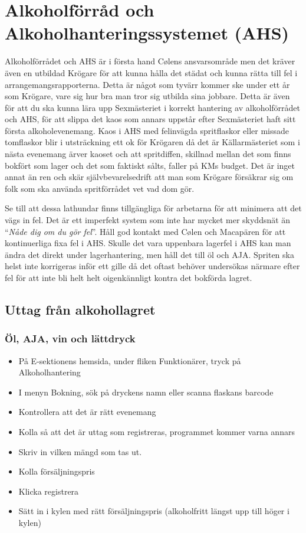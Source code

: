\documentclass[10pt]{article}
\begin{document}
\section{Alkoholförråd och Alkoholhanteringssystemet (AHS)}
Alkoholförrådet och AHS är i första hand Cølens ansvarsområde men det kräver även en utbildad Krögare för att kunna hålla det städat och kunna rätta till fel i arrangemangsrapporterna. Detta är något som tyvärr kommer ske under ett år som Krögare, vare sig hur bra man tror sig utbilda sina jobbare. Detta är även för att du ska kunna lära upp Sexmästeriet i korrekt hantering av alkoholförrådet och AHS, för att slippa det kaos som annars uppstår efter Sexmästeriet haft sitt första alkoholevenemang. Kaos i AHS med felinvägda spritflaskor eller missade tomflaskor blir i utsträckning ett ok för Krögaren då det är Källarmästeriet som i nästa evenemang ärver kaoset och att spritdiffen, skillnad mellan det som finns bokfört som lager och det som faktiskt sålts, faller på KMs budget. Det är inget annat än ren och skär självbevarelsedrift att man som Krögare försäkrar sig om folk som ska använda spritförrådet vet vad dom gör.

Se till att dessa lathundar finns tillgängliga för arbetarna för att minimera att det vägs in fel. Det är ett imperfekt system som inte har mycket mer skyddsnät än ``\textit{Nåde dig om du gör fel}''. Håll god kontakt med Cølen och Macapären för att kontinuerliga fixa fel i AHS. Skulle det vara uppenbara lagerfel i AHS kan man ändra det direkt under lagerhantering, men håll det till öl och AJA. Spriten ska helst inte korrigeras inför ett gille då det oftast behöver undersökas närmare efter fel för att inte bli helt helt oigenkännligt kontra det bokförda lagret.

\subsection{Uttag från alkohollagret}
\subsubsection*{Öl, AJA, vin och lättdryck}
\begin{itemize}
	\item På E-sektionens hemsida, under fliken Funktionärer, tryck på Alkoholhantering
    \item I menyn Bokning, sök på dryckens namn eller scanna flaskans barcode
    \item Kontrollera att det är rätt evenemang
    \item Kolla så att det är uttag som registreras, programmet kommer varna annars
    \item Skriv in vilken mängd som tas ut.
    \item Kolla försäljningspris
    \item Klicka registrera
    \item Sätt in i kylen med rätt försäljningspris (alkoholfritt längst upp till höger i kylen)
\end{itemize}
\end{document}

